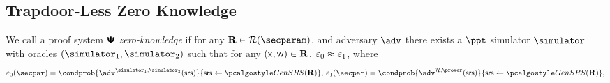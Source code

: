 \subsection{Trapdoor-Less Zero Knowledge}







\iffalse
We call a proof system $\bm{\mathsf{\Psi}}$ \emph{zero-knowledge} if for any
$\REL \in \RELGEN(\secparam)$, and adversary $\adv$ there exists a $\ppt$ simulator
$\simulator$ with oracles $(\simulator_1,\simulator_2)$ such that for any $(\mathsf{x}, \mathsf{w}) \in \mathbf{R}$, $\varepsilon_0 \approx \varepsilon_1$,
where
\[
  \eps_0(\secpar) = \condprob{\adv^{\simulator_1,\simulator_2} (\srs)}{\srs \gets \kgen
    (\REL)},\,  \eps_1 (\secpar) = \condprob{\adv^{\ro,\prover} (\srs)}{\srs \gets \kgen (\REL)},
\]


